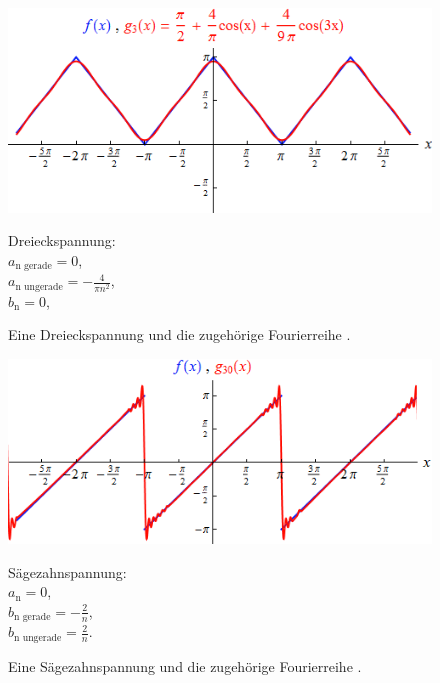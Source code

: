 \begin{figure}[H]
\hspace{73pt}
\begin{minipage}[t]{6cm}
\vspace{0pt}
\centering
\includegraphics[scale=0.5]{vorb2.png}
\caption{Eine Dreieckspannung und die zugehörige Fourierreihe \cite{sample2}.}
\label{fig:vorb2}
\end{minipage}
\hfill
\hspace{73pt}
\begin{minipage}[t]{6cm}
\vspace{0pt}
Dreieckspannung: \\
$a_\text{n gerade} = 0$, \\
$a_\text{n ungerade} = - \frac{4}{\pi n^{2}}$, \\
$b_\text{n} = 0$,
\end{minipage}
\end{figure}

\begin{figure}[H]
\hspace{73pt}
\begin{minipage}[t]{6cm}
\vspace{0pt}
\centering
\includegraphics[scale=0.5]{vorb3.png}
\caption{Eine Sägezahnspannung und die zugehörige Fourierreihe \cite{sample2}.}
\label{fig:vorb3}
\end{minipage}
\hfill
\hspace{73pt}
\begin{minipage}[t]{6cm}
\vspace{0pt}
Sägezahnspannung: \\
$a_\text{n} = 0$, \\
$b_\text{n gerade} = - \frac{2}{n}$, \\
$b_\text{n ungerade} = \frac{2}{n}$.
\end{minipage}
\end{figure}

